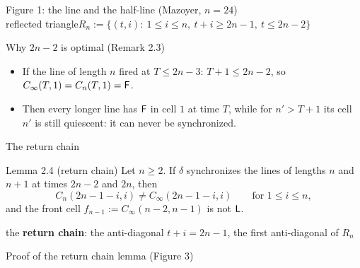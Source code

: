 \begin{frame}{Figure 1: the line and the half-line (Mazoyer, $n=24$)}
\centering\fig[0.72]{}\\[0.5ex]
\small reflected triangle\quad $R_n:=\{(t,i):\ 1\le i\le n,\ t+i\ge 2n-1,\ t\le 2n-2\}$
\end{frame}

\begin{frame}{Why $2n-2$ is optimal (Remark 2.3)}
\centering\fig[0.50]{}
\begin{itemize}\small
\item If the line of length $n$ fired at $T\le2n-3$: $T+1\le2n-2$, so $C_\infty(T,1)=C_n(T,1)=\mathsf F$.
\item Then every longer line has $\mathsf F$ in cell $1$ at time $T$, while for $n'>T+1$ its cell $n'$ is still quiescent: it can never be synchronized.
\end{itemize}
\end{frame}

\begin{frame}{The return chain}
\begin{statement}{Lemma 2.4 (return chain)}
Let $n\ge2$. If $\delta$ synchronizes the lines of lengths $n$ and $n+1$ at times $2n-2$ and $2n$, then
\[C_n(2n-1-i,i)\ne C_\infty(2n-1-i,i)\qquad\text{for }1\le i\le n,\]
and the front cell $f_{n-1}:=C_\infty(n-2,n-1)$ is not $\mathsf L$.
\end{statement}
\vspace{1ex}
\begin{center}the \textbf{return chain}: the anti-diagonal $t+i=2n-1$, the first anti-diagonal of $R_n$\end{center}
\end{frame}

\begin{frame}{Proof of the return chain lemma (Figure 3)}
\centering\fig[0.52]{}\\[1ex]
\begin{plainbox}\small
{}%
%
\end{plainbox}
\end{frame}

